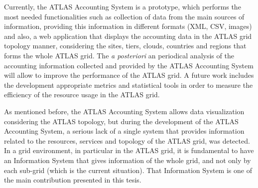 Currently, the ATLAS Accounting System is a prototype, which performs
the most needed functionalities such as collection of data from the
main sources of information, providing this information in different
formats (XML, CSV, images) and also, a web application that displays
the accounting data in the ATLAS grid topology manner, considering the
sites, tiers, clouds, countries and regions that forms the whole ATLAS
grid.
The {\itshape a posteriori} an periodical analysis of the accounting
information collected and provided by the ATLAS Accounting System will
allow to improve the performance of the ATLAS grid. 
A future work includes the development appropriate metrics and
statistical tools in order to measure the efficiency of the resource
usage in the ATLAS grid.
    

As  mentioned before, the ATLAS Accounting System allows data
visualization considering the ATLAS topology, but during the
development of the ATLAS Accounting System, a serious lack of a single
system that provides information related to the resources, services
and topology of the ATLAS grid, was detected. 
In a grid environment, in particular in the ATLAS grid, it is
fundamental to have an Information System that gives information of
the whole grid, and not only by each sub-grid (which is the current
situation).
That Information System is one of the main contribution presented in
this tesis.

